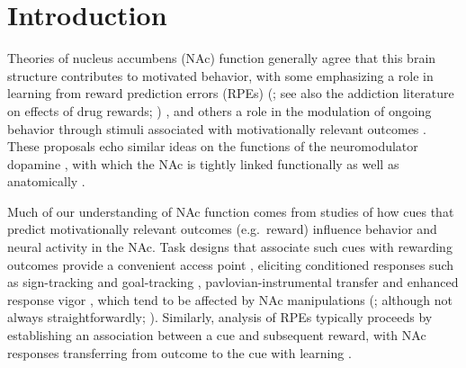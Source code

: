 \documentclass[11pt]{article}
\let\cite=\citep
\let\citeNP=\citealt
\providecommand{\DIFadd}[1]{{\protect\color{red} \sf #1}} %
\providecommand{\DIFaddbegin}{} %
\providecommand{\DIFaddend}{} %
\newcommand{\DIFaddincludegraphics}[2][]{{\color{red}\fbox{\DIFOincludegraphics[#1]{#2}}}} %
\DeclareRobustCommand{\DIFaddbegin}{\DIFOaddbegin \let\includegraphics\DIFaddincludegraphics} %
\DeclareRobustCommand{\DIFaddend}{\DIFOaddend \let\includegraphics\DIFOincludegraphics} %
\begin{document}
\newpage

\section*{Introduction}

Theories of nucleus accumbens (NAc) function generally agree that this
brain structure contributes to motivated behavior, with some
emphasizing a role in learning from reward prediction errors (RPEs)
(\citeNP{Joel2002,Maia2009,Khamassi2012,Lee2012,Schultz2016,Averbeck2017};
see also the addiction literature on effects of drug rewards;
\citeNP{Kalivas2005,Hyman2006,Carelli2009})\DIFaddbegin \DIFadd{, }\DIFaddend and others a role in the
modulation of ongoing behavior through stimuli associated with
motivationally relevant outcomes \cite[invigorating,
  directing;][]{Nicola2010a,Salamone2012,Floresco2015}. These
proposals echo similar ideas on the functions of the neuromodulator
dopamine \cite{Maia2009,Berridge2012,Salamone2012,Schultz2016}, with
which the NAc is tightly linked functionally as well as anatomically
\cite{Cheer2007,Ikemoto2007,DuHoffmann2014,Takahashi2016}.

Much of our understanding of NAc function comes from studies of how
cues that predict motivationally relevant outcomes (e.g.\ reward)
influence behavior and neural activity in the NAc. Task designs that
associate such cues with rewarding outcomes provide a convenient
access point\DIFaddbegin \DIFadd{, }\DIFaddend eliciting conditioned responses such as sign-tracking and
goal-tracking \cite{hearst1974sign,Robinson2009},
pavlovian-instrumental transfer \cite{Estes1943,Rescorla1967} and
enhanced response vigor \cite{Niv2007,Nicola2010a}, which tend to be
affected by NAc manipulations
(\citeNP{Corbit2011,Flagel2011,Chang2012}; although not always
straightforwardly; \citeNP{Giertler2004,Chang2013}). Similarly,
analysis of RPEs typically proceeds by establishing an association
between a cue and subsequent reward, with NAc responses transferring
from outcome to the cue with learning
\cite{Schultz1997,Setlow2003,Roitman2005,Day2007a}.
\end{document}
